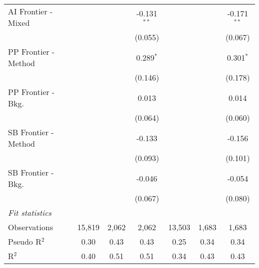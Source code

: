 \begin{tabular}{lcccccc}
   AI Frontier - Mixed  &         &              & -0.131$^{**}$ &              &         & -0.171$^{**}$\\   
                        &         &              & (0.055)       &              &         & (0.067)\\   
   PP Frontier - Method &         &              & 0.289$^{*}$   &              &         & 0.301$^{*}$\\   
                        &         &              & (0.146)       &              &         & (0.178)\\   
   PP Frontier - Bkg.   &         &              & 0.013         &              &         & 0.014\\   
                        &         &              & (0.064)       &              &         & (0.060)\\   
   SB Frontier - Method &         &              & -0.133        &              &         & -0.156\\   
                        &         &              & (0.093)       &              &         & (0.101)\\   
   SB Frontier - Bkg.   &         &              & -0.046        &              &         & -0.054\\   
                        &         &              & (0.067)       &              &         & (0.080)\\   
   \midrule
   \emph{Fit statistics}\\
   Observations         & 15,819  & 2,062        & 2,062         & 13,503       & 1,683   & 1,683\\  
   Pseudo R$^2$         & 0.30    & 0.43         & 0.43          & 0.25         & 0.34    & 0.34\\  
   R$^2$                & 0.40    & 0.51         & 0.51          & 0.34         & 0.43    & 0.43\\  
   

\end{tabular}
